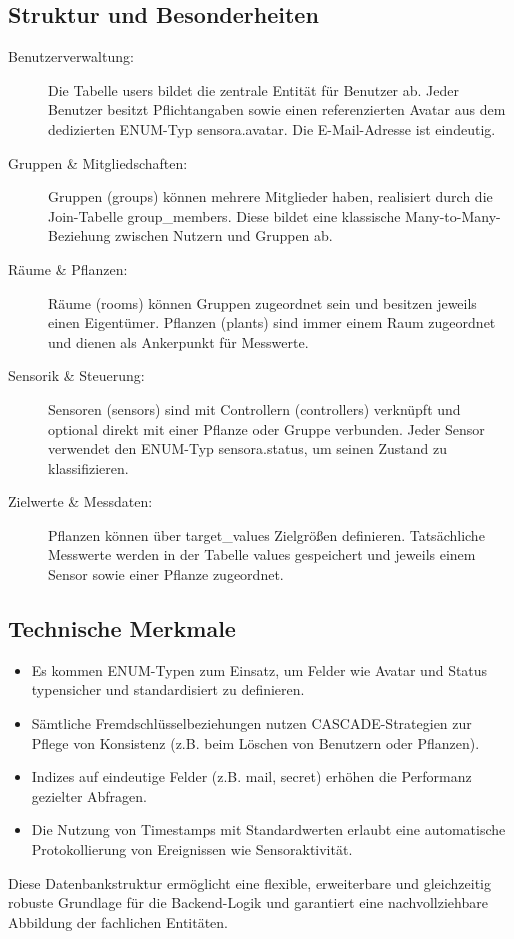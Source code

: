 \subsection{Struktur und Besonderheiten}
\begin{description}
    \item[Benutzerverwaltung:]
    Die Tabelle users bildet die zentrale Entität für Benutzer ab. Jeder Benutzer besitzt Pflichtangaben sowie einen referenzierten Avatar aus dem dedizierten ENUM-Typ sensora.avatar. Die E-Mail-Adresse ist eindeutig.
    \item[Gruppen \& Mitgliedschaften:]
    Gruppen (groups) können mehrere Mitglieder haben, realisiert durch die Join-Tabelle group\_members. Diese bildet eine klassische Many-to-Many-Beziehung zwischen Nutzern und Gruppen ab.
    \item[Räume \& Pflanzen:]
    Räume (rooms) können Gruppen zugeordnet sein und besitzen jeweils einen Eigentümer. Pflanzen (plants) sind immer einem Raum zugeordnet und dienen als Ankerpunkt für Messwerte.
    \item [Sensorik \& Steuerung:]
    Sensoren (sensors) sind mit Controllern (controllers) verknüpft und optional direkt mit einer Pflanze oder Gruppe verbunden. Jeder Sensor verwendet den ENUM-Typ sensora.status, um seinen Zustand zu klassifizieren.
    \item [Zielwerte \& Messdaten:]
    Pflanzen können über target\_values Zielgrößen definieren. Tatsächliche Messwerte werden in der Tabelle values gespeichert und jeweils einem Sensor sowie einer Pflanze zugeordnet.
\end{description}

\subsection{Technische Merkmale}
\begin{itemize}
    \item Es kommen ENUM-Typen zum Einsatz, um Felder wie Avatar und Status typensicher und standardisiert zu definieren.
    \item Sämtliche Fremdschlüsselbeziehungen nutzen CASCADE-Strategien zur Pflege von Konsistenz (z.B. beim Löschen von Benutzern oder Pflanzen).
    \item Indizes auf eindeutige Felder (z.B. mail, secret) erhöhen die Performanz gezielter Abfragen.
    \item Die Nutzung von Timestamps mit Standardwerten erlaubt eine automatische Protokollierung von Ereignissen wie Sensoraktivität.
\end{itemize}

Diese Datenbankstruktur ermöglicht eine flexible, erweiterbare und gleichzeitig robuste Grundlage für die Backend-Logik und garantiert eine nachvollziehbare Abbildung der fachlichen Entitäten.